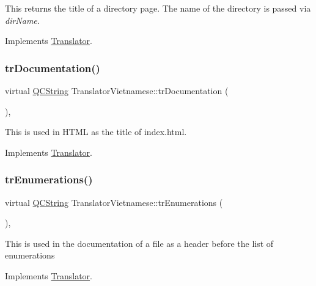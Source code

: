 This returns the title of a directory page. The name of the directory is passed via {\itshape dir\+Name}. 

Implements \mbox{\hyperlink{class_translator}{Translator}}.

\mbox{\label{class_translator_vietnamese_a0b4e0c558aa89cf04175fae0502712ca}} 
\subsubsection{\texorpdfstring{trDocumentation()}{trDocumentation()}}
{\footnotesize\ttfamily virtual \mbox{\hyperlink{class_q_c_string}{Q\+C\+String}} Translator\+Vietnamese\+::tr\+Documentation (\begin{DoxyParamCaption}{ }\end{DoxyParamCaption})\hspace{0.3cm}{\ttfamily [inline]}, {\ttfamily [virtual]}}

This is used in H\+T\+ML as the title of index.\+html. 

Implements \mbox{\hyperlink{class_translator}{Translator}}.

\mbox{\label{class_translator_vietnamese_ae5e6d592bbe59c3af7acd83bbcfe79a2}} 
\subsubsection{\texorpdfstring{trEnumerations()}{trEnumerations()}}
{\footnotesize\ttfamily virtual \mbox{\hyperlink{class_q_c_string}{Q\+C\+String}} Translator\+Vietnamese\+::tr\+Enumerations (\begin{DoxyParamCaption}{ }\end{DoxyParamCaption})\hspace{0.3cm}{\ttfamily [inline]}, {\ttfamily [virtual]}}

This is used in the documentation of a file as a header before the list of enumerations 

Implements \mbox{\hyperlink{class_translator}{Translator}}.

\mbox{\label{class_translator_vietnamese_a20e8429631310f5eb494d7277559a07e}} 
